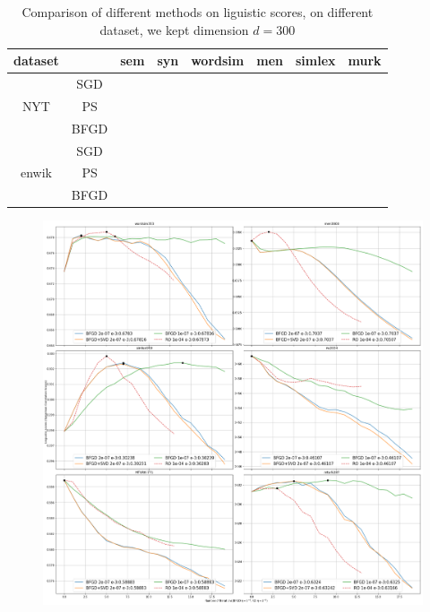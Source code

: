 \documentclass[letterpaper]{article} %
\begin{document}
\begin{table}[]
\begin{tabular}{|c|c|c|c|c|c|c|c|}
\hline
   dataset  &      & sem & syn & wordsim & men & simlex & murk \\ \hline

\multirow{3}{*}{NYT} & SGD   &     &     &         &     &        &      \\ \cline{2-8} 
					 & PS   &     &     &         &     &        &      \\ \cline{2-8} 
                     & BFGD &     &     &         &     &        &      \\ \hline
\multirow{3}{*}{enwik} & SGD   &     &     &         &     &        &      \\ \cline{2-8} 
					 & PS   &     &     &         &     &        &      \\ \cline{2-8} 
                     & BFGD &     &     &         &     &        &      \\ \hline
\end{tabular}
\caption{Comparison of different methods on liguistic scores, on different dataset, we kept dimension $d=300$}
\end{table}
\begin{figure}
\includegraphics[width=\linewidth]{img/correlation.png} 
\end{figure}
\end{document}
